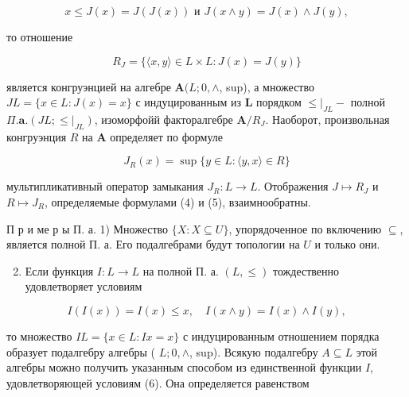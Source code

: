 \documentclass[10pt]{article}
\begin{document}
\[

x \leqslant J(x)=J(J(x)) \text { и } J(x \wedge y)=J(x) \wedge J(y),

\]



то отношение



\[

R_{J}=\{\langle x, y\rangle \in L \times L: J(x)=J(y)\}

\]



является конгруэнцией на алгебре $\boldsymbol{A}(L ; 0, \wedge$, sup), а множество $J L=\{x \in L: J(x)=x\}$ с индуцированным из $\boldsymbol{L}$ порядком $\leqslant\left.\right|_{J L}-$ полной $\Pi . \mathbf{a} .\left(J L ; \leqslant\left.\right|_{J L}\right)$, изоморфойй факторалгебре $\boldsymbol{A} / R_{J}$. Наоборот, произвольная конгруэнция $R$ на $\boldsymbol{A}$ определяет по формуле



\[

J_{R}(x)=\sup \{y \in L:\langle y, x\rangle \in R\}

\]



мультипликативный оператор замыкания $J_{R}: L \rightarrow L$. Отображения $J \mapsto R_{J}$ и $R \mapsto J_{R}$, определяемые формулами (4) и (5), взаимнообратны.



П р и ме р ы П. а. 1) Множество $\{X: X \subseteq U\}$, упорядоченное по включению $\subseteq$, является полной П. а. Его подалгебрами будут топологии на $U$ и только они.



\begin{enumerate}

  \setcounter{enumi}{1}

  \item Если функция $I: L \rightarrow L$ на полной П. а. $(L, \leqslant)$ тождественно удовлетворяет условиям

\end{enumerate}



\[

I(I(x))=I(x) \leqslant x, \quad I(x \wedge y)=I(x) \wedge I(y),

\]



то множество $I L=\{x \in L: I x=x\}$ с индуцированным отношением порядка образует подалгебру алгебры ( $L ; 0, \wedge$, sup). Всякую подалгебру $A \subseteq L$ этой алгебры можно получить указанным способом из единственной функции $I$, удовлетворяющей условиям (6). Она определяется равенством
\end{document}
